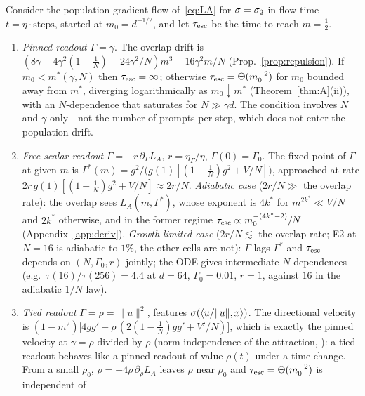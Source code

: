 \begin{proposition}
\label{prop:shrink}
Consider the population gradient flow of~\eqref{eq:LA} for $\sigma=\sigma_2$ in flow time $t=\eta\cdot\text{steps}$, started at $m_0=d^{-1/2}$,
and let $\tau_{\rm esc}$ be the time to reach $m=\tfrac12$.
\begin{enumerate}
\item[(a)] \emph{Pinned readout} $\Gamma=\gamma$. The overlap drift is $(8\gamma-4\gamma^2(1-\tfrac1N)-24\gamma^2/N)m^3-16\gamma^2m/N$ (Prop.~\ref{prop:repulsion}).
If $m_0<m^*(\gamma,N)$ then $\tau_{\rm esc}=\infty$; otherwise $\tau_{\rm esc}=\Theta(m_0^{-2})$ for $m_0$ bounded away from $m^*$, diverging logarithmically as $m_0\downarrow m^*$ (Theorem~\ref{thm:A}(ii)), with an $N$-dependence that saturates for $N\gg\gamma d$.
The condition involves $N$ and $\gamma$ only---not the number of prompts per step, which does not enter the population drift.
\item[(b)] \emph{Free scalar readout} $\dot\Gamma=-r\,\partial_\Gamma L_A$, $r=\eta_\Gamma/\eta$, $\Gamma(0)=\Gamma_0$. The fixed point of $\Gamma$ at given $m$ is
$\Gamma^*(m)=g^2/\big(g(1)[(1-\tfrac1N)g^2+V/N]\big)$, approached at rate $2r\,g(1)[(1-\tfrac1N)g^2+V/N]\approx2r/N$. \emph{Adiabatic case}
($2r/N\gg$ the overlap rate): the overlap sees $L_A(m,\Gamma^*)$, whose exponent is $4k^*$ for $m^{2k^*}\ll V/N$ and $2k^*$ otherwise, and in the
former regime $\tau_{\rm esc}\propto m_0^{-(4k^*-2)}/N$ (Appendix~\ref{app:deriv}). \emph{Growth-limited case} ($2r/N\lesssim$ the overlap rate; E2 at $N=16$ is adiabatic to $1\%$, the other cells are not): $\Gamma$ lags $\Gamma^*$ and $\tau_{\rm esc}$ depends on $(N,\Gamma_0,r)$ jointly; the ODE gives intermediate
$N$-dependences (e.g.\ $\tau(16)/\tau(256)=4.4$ at $d=64$, $\Gamma_0=0.01$, $r=1$, against $16$ in the adiabatic $1/N$ law).
\item[(c)] \emph{Tied readout} $\Gamma=\rho=\|u\|^2$, features $\sigma(\langle u/\|u\|,x\rangle)$. The directional velocity is
$(1-m^2)\big[4gg'-\rho\,(2(1-\tfrac1N)gg'+V'/N)\big]$, which is exactly the pinned velocity at $\gamma=\rho$ divided by $\rho$ (norm-independence
of the attraction, \citealp[Lemma~B.1]{ren2025emergence}): a tied readout behaves like a pinned readout of value $\rho(t)$ under a time
change. From a small $\rho_0$, $\dot\rho=-4\rho\,\partial_\rho L_A$ leaves $\rho$ near $\rho_0$ and $\tau_{\rm esc}=\Theta(m_0^{-2})$ is independent of

\end{enumerate}
\end{proposition}
